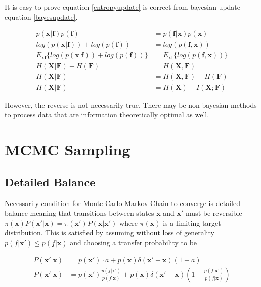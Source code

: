 \documentclass{article}
\begin{document}
It is easy to prove equation \ref{entropyupdate} is correct from bayesian update equation \ref{bayesupdate}.

\begin{equation*}
\begin{aligned}
  p(\bm{x}|\bm{f})p(\bm{f}) &= p(\bm{f}|\bm{x})p(\bm{x})\\
  log(p(\bm{x}|\bm{f})) + log(p(\bm{f})) &= log(p(\bm{f},\bm{x}))\\
  E_{\bm{x}\bm{f}}\{log(p(\bm{x}|\bm{f})) + log(p(\bm{f}))\} &= E_{\bm{x}\bm{f}}\{log(p(\bm{f},\bm{x}))\}\\  
  H(\bm{X}|\bm{F})+H(\bm{F}) &= H(\bm{X},\bm{F}) \\
  H(\bm{X}|\bm{F}) &= H(\bm{X},\bm{F}) - H(\bm{F}) \\
  H(\bm{X}|\bm{F}) &= H(\bm{X}) - I(\bm{X};\bm{F})
\end{aligned}
\end{equation*}

However, the reverse is not necessarily true.  There may be non-bayesian methods to process data that are information theoretically optimal as well.

\section{MCMC Sampling} \label{detailed-balance}

\subsection{Detailed Balance}

Necessarily condition for Monte Carlo Markov Chain to converge is detailed balance meaning that transitions between states
$\mathbf{x}$ and $\mathbf{x}'$ must be reversible $\pi(\mathbf{x})P(\mathbf{x}'|\mathbf{x}) = \pi(\mathbf{x}')P(\mathbf{x}|\mathbf{x}')$
where $\pi(\mathbf{x})$ is a limiting target distribution. This is satisfied by assuming without loss of generality
$p(f|\mathbf{x}') \leq p(f|\mathbf{x})$ and choosing a transfer probability to be 

\begin{equation} \label{transfer1}
  \begin{aligned}
    P(\mathbf{x}'|\mathbf{x}) &= p(\mathbf{x}') \cdot a + p(\mathbf{x})\delta(\mathbf{x}' - \mathbf{x})(1 - a) \\
    P(\mathbf{x}'|\mathbf{x}) &= p(\mathbf{x}') \frac{p(f|\mathbf{x}')}{p(f|\mathbf{x})} + p(\mathbf{x})\delta(\mathbf{x}' - \mathbf{x})(1 - \frac{p(f|\mathbf{x}')}{p(f|\mathbf{x})})
  \end{aligned}
\end{equation}
\end{document}
